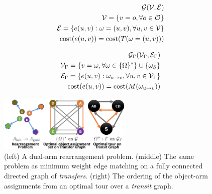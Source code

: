 \begin{minipage}{0.48\textwidth}
  \begin{align}
  \label{eq:transfergraph}
  \begin{split}
  \mathcal{G}(\mathcal{V}, \mathcal{E})\\
  \mathcal{V} = \{ {v}=o, \forall o \in \mathcal{O} \}\\
  \mathcal{E} = \{ {e}(u, v): {\omega} = (u,v), \forall u,v\in\mathcal{V} \}\\
  \textup{cost}({e}(u,v)) = \textup{cost}(T({\omega}=(u,v)))
  \end{split}
  \end{align}
\end{minipage}
\begin{minipage}{0.48\textwidth}
  \begin{align}
  \label{eq:transitgraph}
  \begin{split}
  \mathcal{G}_{{\Gamma}}(\mathcal{V}_{{\Gamma}}, \mathcal{E}_{{\Gamma}})\\
  \mathcal{V}_{{\Gamma}} = \{ {v}={\omega}, \forall {\omega} \in \{{{\Omega}}\}^* \} \cup \{{\omega}_S\} \\
  \mathcal{E}_{{\Gamma}} = \{ {e}(u, v): {\omega}_{u\rightarrow v}, \forall u,v\in\mathcal{V}_{{\Gamma}} \}\\
  \textup{cost}({e}(u,v)) = \textup{cost}(M({\omega}_{u\rightarrow v}))
  \end{split}
  \end{align}
\end{minipage}
\vspace{0.05in}


\begin{figure}
\vspace{-0.15in}
	\begin{center}
		\includegraphics[width=2.5in]{figures/mapp_labels}
	\end{center}\vspace{-0.2in}
	\caption{(left) A dual-arm rearrangement problem. (middle) The same problem as minimum weight edge matching on a fully connected directed graph of \textit{transfers}. (right) The ordering of the object-arm assignments from an optimal tour over a \textit{transit} graph.}\vspace{-0.2in}
	\label{fig:edge_matching}
\vspace{-0.1in}
\end{figure}

